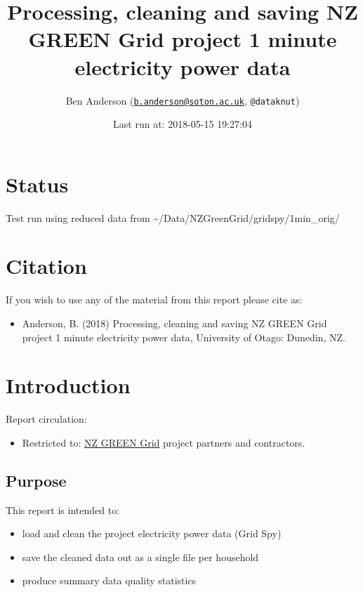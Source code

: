 \documentclass[]{article}
\title{Processing, cleaning and saving NZ GREEN Grid project 1 minute
electricity power data}
\author{Ben Anderson
(\href{mailto:b.anderson@soton.ac.uk}{\nolinkurl{b.anderson@soton.ac.uk}},
\texttt{@dataknut})}
\date{Last run at: 2018-05-15 19:27:04}
\providecommand{\tightlist}{%
  \setlength{\itemsep}{0pt}\setlength{\parskip}{0pt}}
\begin{document}
\maketitle

{
\setcounter{tocdepth}{2}
\tableofcontents
}
\newpage

\section{Status}\label{status}

Test run using reduced data from
\textasciitilde{}/Data/NZGreenGrid/gridspy/1min\_orig/

\section{Citation}\label{citation}

If you wish to use any of the material from this report please cite as:

\begin{itemize}
\tightlist
\item
  Anderson, B. (2018) Processing, cleaning and saving NZ GREEN Grid
  project 1 minute electricity power data, University of Otago: Dunedin,
  NZ.
\end{itemize}

\newpage

\section{Introduction}\label{introduction}

Report circulation:

\begin{itemize}
\tightlist
\item
  Restricted to:
  \href{https://www.otago.ac.nz/centre-sustainability/research/energy/otago050285.html}{NZ
  GREEN Grid} project partners and contractors.
\end{itemize}

\subsection{Purpose}\label{purpose}

This report is intended to:

\begin{itemize}
\tightlist
\item
  load and clean the project electricity power data (Grid Spy)
\item
  save the cleaned data out as a single file per household
\item
  produce summary data quality statistics
\end{itemize}
\end{document}
